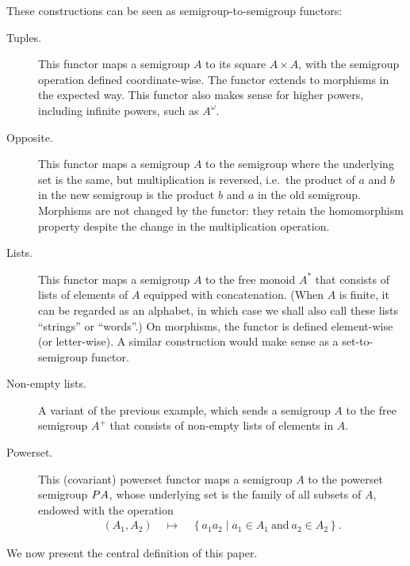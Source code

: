  \begin{example}\label{ex:functors}
 These constructions can be seen as semigroup-to-semigroup functors:
 \begin{description}
 \item[Tuples.] This functor maps a semigroup $A$ to its square $A \times A$, with the semigroup operation defined coordinate-wise. The functor extends to morphisms in the expected way. This functor also makes sense for higher powers, including infinite powers, such as $A^\omega$.
 \item[Opposite.] This functor maps a semigroup $A$ to the semigroup where the underlying set is the same, but multiplication is reversed, i.e.~the product of $a$ and $b$ in the new semigroup is the product $b$ and $a$ in the old semigroup. Morphisms are not changed by the functor: they retain the homomorphism property despite the change in the multiplication operation.
 \item[Lists.] This functor maps a semigroup $A$ to the free monoid $A^*$ that
   consists of lists of elements of $A$ equipped with concatenation. (When $A$
   is finite, it can be regarded as an alphabet, in which case we shall also
   call these lists \enquote{strings} or \enquote{words}.) On morphisms, the functor is defined element-wise (or letter-wise). A similar construction would make sense as a set-to-semigroup functor.
 \item[Non-empty lists.] A variant of the previous example, which sends a
   semigroup $A$ to the free semigroup $A^+$ that consists of non-empty lists of
   elements in $A$.
 \item[Powerset.] This (covariant) powerset functor maps a semigroup $A$ to the powerset semigroup $\powerset A$, whose underlying set is the family of all subsets of $A$, endowed with the operation
 \begin{align*}
 (A_1,A_2) \quad \mapsto \quad \left\{a_1 a_2 \mid a_1 \in A_1\ \text{and}\ a_2 \in A_2\right\}.
 \end{align*}
 \end{description}
 \end{example}

\noindent
 We now present the central definition of this paper. 

